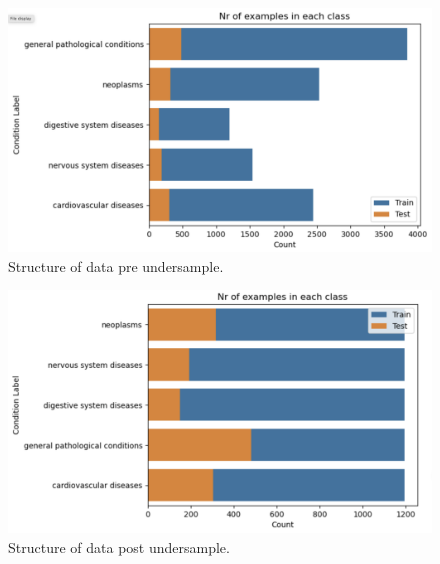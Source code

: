 \begin{figure}[ht]
    \centering
    \includegraphics[width=\columnwidth]{report/figures/data-pre-undersample.png} %
    \caption{Structure of data pre undersample.}
    \label{fig:pre-undersample}
\end{figure}
\vspace{-1em}
\begin{figure}[ht]
    \centering
    \includegraphics[width=\columnwidth]{report/figures/data-post-undersample.png} %
    \caption{Structure of data post undersample.}
    \label{fig:post-undersample}
\end{figure}